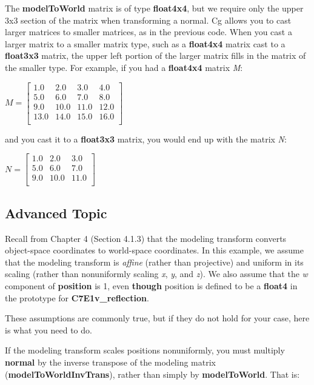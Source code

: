\documentclass[../main.tex]{subfiles}
\begin{document}
The \textbf{modelToWorld} matrix is of type \textbf{float4x4}, but we require only the upper 3x3 section of the matrix when transforming a normal. Cg allows you to cast larger matrices to smaller matrices, as in the previous code. When you cast a larger matrix to a smaller matrix type, such as a \textbf{float4x4} matrix cast to a \textbf{float3x3} matrix, the upper left portion of the larger matrix fills in the matrix of the smaller type. For example, if you had a \textbf{float4x4} matrix \textit{M}:

$
M = \begin{bmatrix}
1.0 & 2.0 & 3.0 & 4.0 \\
5.0 & 6.0 & 7.0 & 8.0 \\
9.0 & 10.0 & 11.0 & 12.0 \\
13.0 & 14.0 & 15.0 & 16.0 \\
\end{bmatrix}
$

and you cast it to a \textbf{float3x3} matrix, you would end up with the matrix \textit{N}:

$
N = \begin{bmatrix}
1.0 & 2.0 & 3.0 \\
5.0 & 6.0 & 7.0 \\
9.0 & 10.0 & 11.0 \\
\end{bmatrix}
$

\subsection*{Advanced Topic}

Recall from Chapter 4 (Section 4.1.3) that the modeling transform converts object-space coordinates to world-space coordinates. In this example, we assume that the modeling transform is \textit{affine} (rather than projective) and uniform in its scaling (rather than nonuniformly scaling \textit{x}, \textit{y}, and \textit{z}). We also assume that the \textit{w} component of \textbf{position} is 1, even \textbf{though} position is defined to be a \textbf{float4} in the prototype for \textbf{C7E1v_reflection}.

These assumptions are commonly true, but if they do not hold for your case, here is what you need to do.

If the modeling transform scales positions nonuniformly, you must multiply \textbf{normal} by the inverse transpose of the modeling matrix (\textbf{modelToWorldInvTrans}), rather than simply by \textbf{modelToWorld}. That is:
\end{document}
